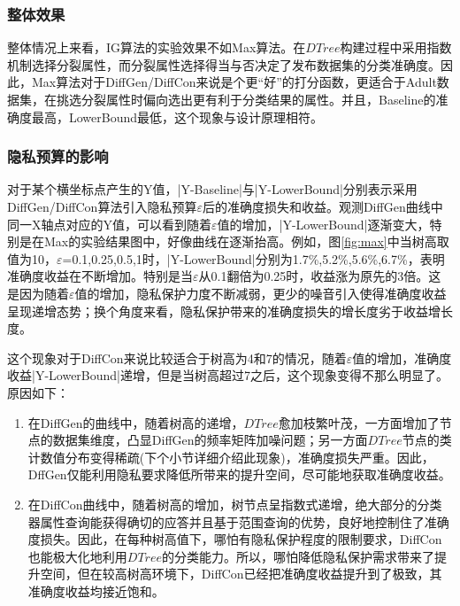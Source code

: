 \subsubsection{整体效果}    
整体情况上来看，IG算法的实验效果不如Max算法。在$DTree$构建过程中采用指数机制选择分裂属性，而分裂属性选择得当与否决定了发布数据集的分类准确度。因此，Max算法对于DiffGen/DiffCon来说是个更“好”的打分函数，更适合于Adult数据集，在挑选分裂属性时偏向选出更有利于分类结果的属性。并且，Baseline的准确度最高，LowerBound最低，这个现象与设计原理相符。

\subsubsection{隐私预算的影响}   
对于某个横坐标点产生的Y值，|Y-Baseline|与|Y-LowerBound|分别表示采用DiffGen/DiffCon算法引入隐私预算$\varepsilon$后的准确度损失和收益。观测DiffGen曲线中同一X轴点对应的Y值，可以看到随着$\varepsilon$值的增加，|Y-LowerBound|逐渐变大，特别是在Max的实验结果图中，好像曲线在逐渐抬高。例如，图\ref{fig:max}中当树高取值为10，$\varepsilon$=0.1,0.25,0.5,1时，|Y-LowerBound|分别为1.7\%,5.2\%,5.6\%,6.7\%，表明准确度收益在不断增加。特别是当$\varepsilon$从0.1翻倍为0.25时，收益涨为原先的3倍。这是因为随着$\varepsilon$值的增加，隐私保护力度不断减弱，更少的噪音引入使得准确度收益呈现递增态势；换个角度来看，隐私保护带来的准确度损失的增长度劣于收益增长度。

这个现象对于DiffCon来说比较适合于树高为4和7的情况，随着$\varepsilon$值的增加，准确度收益|Y-LowerBound|递增，但是当树高超过7之后，这个现象变得不那么明显了。原因如下：
\begin{enumerate}
	\item 在DiffGen的曲线中，随着树高的递增，$DTree$愈加枝繁叶茂，一方面增加了节点的数据集维度，凸显DiffGen的频率矩阵加噪问题；另一方面$DTree$节点的类计数值分布变得稀疏(下个小节详细介绍此现象)，准确度损失严重。因此，DffGen仅能利用隐私要求降低所带来的提升空间，尽可能地获取准确度收益。
	\item 在DiffCon曲线中，随着树高的增加，树节点呈指数式递增，绝大部分的分类器属性查询能获得确切的应答并且基于范围查询的优势，良好地控制住了准确度损失。因此，在每种树高值下，哪怕有隐私保护程度的限制要求，DiffCon也能极大化地利用$DTree$的分类能力。所以，哪怕降低隐私保护需求带来了提升空间，但在较高树高环境下，DiffCon已经把准确度收益提升到了极致，其准确度收益均接近饱和。
\end{enumerate}

